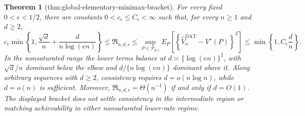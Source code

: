 \documentclass{article}
\newtheorem{theorem}{Theorem}
\begin{document}
\begin{theorem}[thm:global-elementary-minimax-bracket]\label{thm:global-elementary-minimax-bracket}
For every fixed \(0<\epsilon<1/2\), there are constants \(0<c_\epsilon\leq C_\epsilon<\infty\) such that, for every \(n\geq1\) and \(d\geq2\),
\[
 c_\epsilon\min\!\left\{1,
   \frac{\sqrt d}{n}+\frac d{n\log(en)}
 \right\}
 \leq\mathfrak R_{n,d,\epsilon}
 \leq\sup_{P\in\mathcal P_{d,\epsilon}}
 E_P\!\left[
  \left\{\widehat V_n^{\mathrm{DAT}}-V^\star(P)\right\}^2
 \right]
 \leq\min\!\left\{1,C_\epsilon\frac dn\right\}.
\]
In the nonsaturated range the lower terms balance at \(d\asymp\{\log(en)\}^2\), with \(\sqrt d/n\) dominant below the elbow and \(d/\{n\log(en)\}\) dominant above it.  Along arbitrary sequences with \(d\geq2\), consistency requires \(d=o(n\log n)\), while \(d=o(n)\) is sufficient.  Moreover, \(\mathfrak R_{n,d,\epsilon}=\Theta(n^{-1})\) if and only if \(d=O(1)\).  The displayed bracket does not settle consistency in the intermediate region or matching achievability in either nonsaturated lower-rate regime.
\end{theorem}
\end{document}
